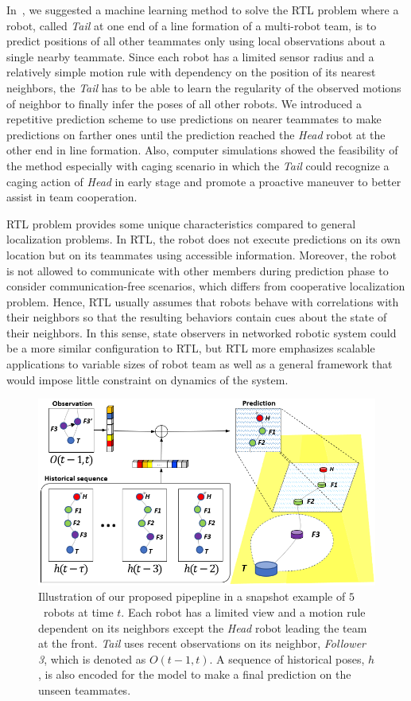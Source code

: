 \documentclass[letterpaper, 10 pt, conference]{ieeeconf}  %
\begin{document}
	In~\cite{CPR17}, we suggested a machine learning method to solve the
	RTL problem where a robot, called \emph{Tail} at one end of a line formation of
	a multi-robot team, is to predict positions of all other teammates only using local
	observations about a single nearby teammate. Since each robot has a limited sensor
	radius and a relatively simple motion rule with dependency
	on the position of its nearest neighbors,
	the \emph{Tail} has to be able to learn the regularity
	of the observed motions of neighbor to finally infer the poses of all other robots.
	We introduced a repetitive prediction scheme to use predictions on
	nearer teammates to make predictions on farther ones until the prediction
	reached the \emph{Head} robot at the other end in line formation.
	Also, computer simulations showed the feasibility of the method
	especially with caging scenario in which the \emph{Tail} could recognize a
	caging action of \emph{Head} in early stage and promote a proactive maneuver to
	better assist in team cooperation.

	RTL problem provides some unique characteristics compared to general localization problems.
	In RTL, the robot does not execute predictions on its own location but on
	its teammates using accessible information.
	Moreover, the robot is not allowed to communicate with other members during
	prediction phase to consider communication-free scenarios, which differs from
	cooperative localization problem.
	Hence, RTL usually assumes that robots behave with correlations with their neighbors
	so that the resulting behaviors contain cues about the state of their neighbors.
	In this sense, state observers in networked robotic system could be a more similar
	configuration to RTL, but RTL more emphasizes
	scalable applications to variable sizes of robot team as well as a general framework
	that would impose little constraint on dynamics of the system.

	\begin{figure}\centering
		\includegraphics[width=1.\columnwidth]{fig_Concept}
		\caption{Illustration of our proposed pipepline in a snapshot example of
			$5$~robots at time $t$.
			Each robot has a limited view and a motion rule dependent on its neighbors
			except the \emph{Head} robot leading the team at the front.
			\emph{Tail} uses recent observations on its neighbor, \emph{Follower 3},
			which is denoted as $O(t-1,t)$. A sequence of historical poses, $h$, is
			also encoded for the model to make a final prediction on the
			unseen teammates.
		}
		\label{fig:Concept}
	\end{figure}
\end{document}
